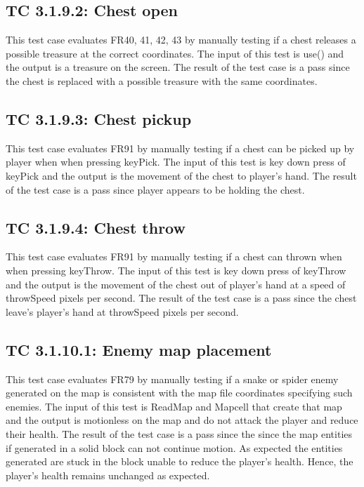 \documentclass[12pt, titlepage]{article}
\begin{document}
\subsection*{TC 3.1.9.2: Chest open}

This test case evaluates FR40, 41, 42, 43 by manually testing if a chest releases a possible treasure at the correct coordinates. The input of this test is use() and the output is a treasure on the screen. The result of the test case is a pass since the chest is replaced with a possible treasure with the same coordinates.

\subsection*{TC 3.1.9.3: Chest pickup}

This test case evaluates FR91 by manually testing if a chest can be picked up by player when when pressing keyPick. The input of this test is key down press of keyPick and the output is the movement of the chest to player's hand. The result of the test case is a pass since player appears to be holding the chest.

\subsection*{TC 3.1.9.4: Chest throw}

This test case evaluates FR91 by manually testing if a chest can thrown when when pressing keyThrow. The input of this test is key down press of keyThrow and the output is the movement of the chest out of player's hand at a speed of throwSpeed pixels per second. The result of the test case is a pass since the chest leave's player's hand at throwSpeed pixels per second.

\subsection*{TC 3.1.10.1: Enemy map placement}

This test case evaluates FR79 by manually testing if a snake or spider enemy generated on the map is consistent with the map file coordinates specifying such enemies. The input of this test is ReadMap and Mapcell that create that map and the output is motionless on the map and do not attack the player and reduce their health. The result of the test case is a pass since the since the map entities if generated in a solid block can not continue motion. As expected the entities generated are stuck in the block unable to reduce the player's health. Hence, the player's health remains unchanged as expected.
\end{document}
